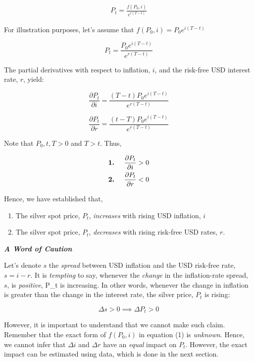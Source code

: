 \documentclass[
  12pt,
]{article}
\providecommand{\tightlist}{%
  \setlength{\itemsep}{0pt}\setlength{\parskip}{0pt}}
\begin{document}
\begin{align}
P_t = \frac{f(P_{0}, i)}{e^{r(T-t)}}
\end{align}

For illustration purposes, let's assume that
\(f(P_0, i) = P_0 e^{i(T-t)}\)

\[P_t = \frac{P_0 e^{i(T-t)}}{e^{r(T-t)}}\]

The partial derivatives with respect to inflation, \(i\), and the
risk-free USD interest rate, \(r\), yield:

\[\frac{\partial P_{t}}{\partial i} = \frac{(T-t)P_0 e^{i(T-t)}}{e^{r(T-t)}}\]

\[\frac{\partial P_{t}}{\partial r} = \frac{(t-T)P_0 e^{i(T-t)}}{e^{r(T-t)}}\]

Note that \(P_0, t, T > 0\) and \(T>t\). Thus,

\begin{align}
\textbf{1.} \hspace{5mm} \frac{\partial P_{t}}{\partial i} &> 0 \notag\\
\textbf{2.} \hspace{5mm} \frac{\partial P_{t}}{\partial r} &< 0 \notag
\end{align}

Hence, we have established that,

\begin{enumerate}
\def\labelenumi{\arabic{enumi}.}
\tightlist
\item
  The silver spot price, \(P_t\), \emph{increases} with rising USD
  inflation, \(i\)
\item
  The silver spot price, \(P_t\), \emph{decreases} with rising risk-free
  USD rates, \(r\).
\end{enumerate}

\textbf{\emph{A Word of Caution}}

Let's denote \(s\) the \emph{spread} between USD inflation and the USD
risk-free rate, \(s = i - r\). It is \emph{tempting} to say, whenever
the \emph{change} in the inflation-rate spread, \(s\), is
\emph{positive}, P\_t is increasing. In other words, whenever the change
in inflation is greater than the change in the interest rate, the silver
price, \(P_t\) is rising:

\[\Delta s >0 \implies \Delta P_t > 0\]

However, it is important to understand that we cannot make such claim.
Remember that the exact form of \(f(P_0, i)\) in equation (1) is
\emph{unknown}. Hence, we cannot infer that \(\Delta i\) and
\(\Delta r\) have an \emph{equal} impact on \(P_t\). However, the exact
impact can be estimated using data, which is done in the next section.
\end{document}
